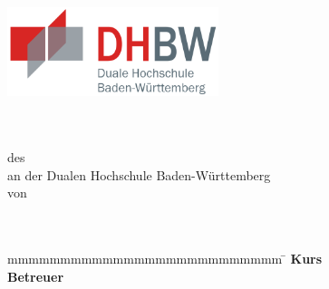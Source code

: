 \begin{titlepage}
	{\begin{center}
		\includegraphics[height=2.6cm]{images/dhbw.png}
	\end{center}}
	\enlargethispage{20mm}
	\begin{center}
		\vspace*{12mm}	{\LARGE\bf \titel }\\
		\vspace*{12mm}	{\large\bf \arbeit}\\
		\vspace*{12mm}	des \studiengang\\
		\vspace*{3mm} 	an der Dualen Hochschule Baden-Württemberg \dhbw\\
		\vspace*{12mm}	von\\
		\vspace*{3mm} 	{\large\bf \autor}\\
		\vspace*{12mm}	\datumAbgabe\\
	\end{center}
	\vfill
	\begin{spacing}{1.2}
	\begin{tabbing}
		mmmmmmmmmmmmmmmmmmmmmmmmmm     \= \kill
		\textbf{Kurs}                  \>  \kurs\\
		\textbf{Betreuer}              \>  \betreuer\\
	\end{tabbing}
	\end{spacing}
\end{titlepage}
